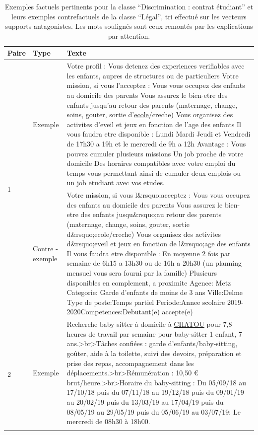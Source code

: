 \begin{longtable}{|p{}|p{}|p{}|}
    \caption{Exemples factuels pertinents pour la classe ``Discrimination : contrat étudiant'' et leurs exemples contrefactuels de la classe ``Légal'', tri effectué sur les vecteurs supports antagonistes. Les mots soulignés sont ceux remontés par les explications par attention.  } \label{tab:results_student_ant5} \\ \hline
    \textbf{Paire}       & \textbf{Type}     & \textbf{Texte}    \\ \hline
    \endfirsthead
    \endhead
    \multirow{2}{*}{1} & Exemple          & Votre profil :    Vous detenez des experiences verifiables avec les enfants, aupres de structures ou de particuliers   Votre mission, si vous l'acceptez :   Vous vous occupez des enfants au domicile des parents  Vous assurez le bien-etre des enfants jusqu'au retour des parents (maternage, change, soins, gouter, sortie d'\underline{ecole}/creche)  Vous organisez des activites d'eveil et jeux en fonction de l'age des enfants   Il vous faudra etre disponible :    Lundi Mardi Jeudi et Vendredi de 17h30 a  19h et le mercredi de 9h a  12h   Avantage :    Vous pouvez cumuler plusieurs missions  Un job proche de votre domicile  Des horaires compatibles avec votre emploi du temps vous permettant ainsi de cumuler deux emplois ou un job etudiant avec vos etudes.  \\ \cline{2-3}
                       & Contre - exemple & Votre mission, si vous l\&rsquo;acceptez : Vous vous occupez des enfants au domicile des parents  Vous assurez le bien-etre des enfants jusqu\&rsquo;au retour des parents (maternage, change, soins, gouter, sortie d\&rsquo;ecole/creche) Vous organisez des activites d\&rsquo;eveil et jeux en fonction de l\&rsquo;age des enfants  Il vous faudra etre disponible : En moyenne 2 fois par semaine de 6h15 a 13h30 ou de 16h a 20h30 (un planning mensuel vous sera fourni par la famille)  Plusieurs disponibles en complement, a proximite Agence: Metz Categorie: Garde d'enfants de moins de 3 ans Ville:Delme Type de poste:Temps partiel Periode:Annee scolaire 2019-2020Competences:Debutant(e) accepte(e)  \\ \hline
    \multirow{2}{*}{2} & Exemple          & Recherche baby-sitter à domicile à \underline{CHATOU} pour 7,8 heures de travail par semaine pour baby-sitter 1 enfant, 7 ans.\textgreater{}br\textgreater{}Tâches confiées : garde d'enfants/baby-sitting, goûter, aide à la toilette, suivi des devoirs, préparation et prise des repas, accompagnement dans les déplacements.\textgreater{}br\textgreater{}Rémunération : 10,50 € brut/heure.\textgreater{}br\textgreater{}Horaire du baby-sitting : Du 05/09/18 au 17/10/18 puis du 07/11/18 au 19/12/18 puis du 09/01/19 au 20/02/19 puis du 13/03/19 au 17/04/19 puis du 08/05/19 au 29/05/19 puis du 05/06/19 au 03/07/19: Le mercredi de 08h30 à 18h00.   \\ \cline{2-3}

\end{longtable}
